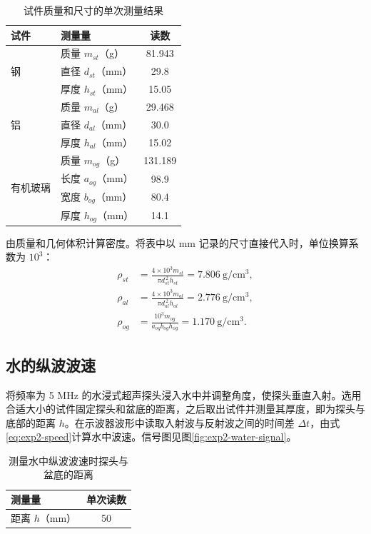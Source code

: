 \documentclass[UTF8,a4paper,12pt]{ctexart}
\numberwithin{equation}{section}
\begin{document}
\begin{table}[H]
\centering
\caption{试件质量和尺寸的单次测量结果}
\label{tab:exp2-density}
\begin{tabular}{llc}
\toprule
试件 & 测量量 & 读数\\
\midrule
\multirow{3}{*}{钢} & 质量 $m_{st}$（g） & 81.943\\
 & 直径 $d_{st}$（mm） & 29.8\\
 & 厚度 $h_{st}$（mm） & 15.05\\
\midrule
\multirow{3}{*}{铝} & 质量 $m_{al}$（g） & 29.468\\
 & 直径 $d_{al}$（mm） & 30.0\\
 & 厚度 $h_{al}$（mm） & 15.02\\
\midrule
\multirow{4}{*}{有机玻璃} & 质量 $m_{og}$（g） & 131.189\\
 & 长度 $a_{og}$（mm） & 98.9\\
 & 宽度 $b_{og}$（mm） & 80.4\\
 & 厚度 $h_{og}$（mm） & 14.1\\
\bottomrule
\end{tabular}
\end{table}

由质量和几何体积计算密度。将表中以 mm 记录的尺寸直接代入时，单位换算系数为 $10^3$：
\begin{subequations}
\begin{align}
  \rho_{st}&=\frac{4\times10^3m_{st}}{\pi d_{st}^{\,2}h_{st}}
  =7.806\ \mathrm{g/cm^3},\\
  \rho_{al}&=\frac{4\times10^3m_{al}}{\pi d_{al}^{\,2}h_{al}}
  =2.776\ \mathrm{g/cm^3},\\
  \rho_{og}&=\frac{10^3m_{og}}{a_{og}b_{og}h_{og}}
  =1.170\ \mathrm{g/cm^3}.
\end{align}
\end{subequations}

\subsection{水的纵波波速}
将频率为 5 MHz 的水浸式超声探头浸入水中并调整角度，使探头垂直入射。选用合适大小的试件固定探头和盆底的距离，之后取出试件并测量其厚度，即为探头与底部的距离 $h$。在示波器波形中读取入射波与反射波之间的时间差 $\Delta t$，由式\eqref{eq:exp2-speed}计算水中波速。信号图见图\ref{fig:exp2-water-signal}。

\begin{table}[H]
\centering
\caption{测量水中纵波波速时探头与盆底的距离}
\label{tab:exp2-water-distance}
\begin{tabular}{lc}
\toprule
测量量 & 单次读数\\
\midrule
距离 $h$（mm） & 50\\
\bottomrule
\end{tabular}
\end{table}
\end{document}
